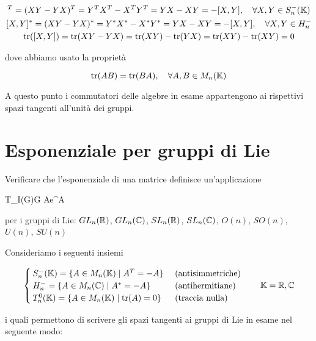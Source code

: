 \begin{gather}
	[X,Y]^{T} = (X Y - Y X)^{T} = Y^{T} X^{T} - X^{T} Y^{T} = Y X - X Y = - [X,Y] %
	\qcomma \forall X,Y \in S^{-}_{n}(\K) \\
	[X,Y]^{*} = (X Y - Y X)^{*} = Y^{*} X^{*} - X^{*} Y^{*} = Y X - X Y = - [X,Y] %
	\qcomma \forall X,Y \in H^{-}_{n} \\
	\tr([X,Y]) = \tr(X Y - Y X) = \tr(X Y) - \tr(Y X) = \tr(X Y) - \tr(X Y) = 0
\end{gather}

dove abbiamo usato la proprietà

\begin{equation}
	\tr(A B) = \tr(B A) \qcomma \forall A,B \in M_{n}(\K)
\end{equation}

A questo punto i commutatori delle algebre in esame appartengono ai rispettivi spazi tangenti all'unità dei gruppi.

%

\newpage

%

\section{Esponenziale per gruppi di Lie}\label{es3-10}

\begin{tcolorbox}
	Verificare che l'esponenziale di una matrice definisce un'applicazione
	
		{T_{I}(G)}{G}
		{A}{e^{A}}
	
	per i gruppi di Lie: $ GL_{n}(\mathbb{R}) $, $ GL_{n}(\mathbb{C}) $, $ SL_{n}(\mathbb{R}) $, $ SL_{n}(\mathbb{C}) $, $ O(n) $, $ SO(n) $, $ U(n) $, $ SU(n) $
\end{tcolorbox}

Consideriamo i seguenti insiemi

\begin{equation}
	\begin{cases}
		S^{-}_{n}(\K) = \{ A \in M_{n}(\K) \mid A^{T} = - A \} & \text{ (antisimmetriche)} \\
		H^{-}_{n} = \{ A \in M_{n}(\C) \mid A^{*} = - A \} & \text{ (antihermitiane)} \\
		T^{0}_{n}(\K) = \{ A \in M_{n}(\K) \mid \tr(A) = 0 \} & \text{ (traccia nulla)}
	\end{cases} %
	\qquad \K = \R, \C
\end{equation}

i quali permettono di scrivere gli spazi tangenti ai gruppi di Lie in esame nel seguente modo:

